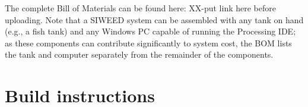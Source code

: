\documentclass[11pt, letterpaper]{article}
\begin{document}
The complete Bill of Materials can be found here: XX-put link here before uploading. Note that a SIWEED system can be assembled with any tank on hand (e.g., a fish tank) and any Windows PC capable of running the Processing IDE; as these components can contribute significantly to system cost, the BOM lists the tank and computer separately from the remainder of the components.
%

\section{Build instructions}
\end{document}
